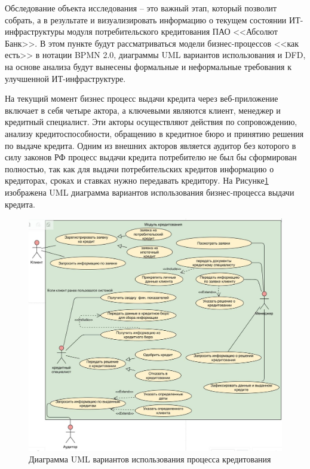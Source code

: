 \documentclass[14pt, a4paper]{extarticle}
\begin{document}
Обследование объекта исследования -- это важный этап, который позволит
собрать, а в результате и визуализировать информацию о текущем состоянии
ИТ-инфраструктуры модуля потребительского кредитования ПАО <<Абсолют Банк>>. В
этом пункте будут рассматриваться модели бизнес-процессов <<как есть>> в
нотации BPMN 2.0, диаграммы UML вариантов использования и DFD, на основе
анализа будут вынесены формальные и неформальные требования к улучшенной
ИТ-инфраструктуре.

На текущий момент бизнес процесс выдачи кредита через веб-приложение включает в
себя четыре актора, а ключевыми являются клиент, менеджер и кредитный
специалист. Эти акторы осуществляют действия по сопровождению, анализу
кредитоспособности, обращению в кредитное бюро и принятию решения по выдаче
кредита. Одним из внешних акторов является аудитор без которого в силу законов
РФ процесс выдачи кредита потребителю не был бы сформирован полностью, так как
для выдачи потребительских кредитов информацию о кредиторах, сроках и ставках
нужно передавать кредитору. На Рисунке\;\ref{fig:uml_use_case} изображена UML
диаграмма вариантов использования бизнес-процесса выдачи кредита.

\begin{figure}[H]
	\centering
	\includegraphics[scale=0.38]{uml_use_case_extended.png}
	\caption{Диаграмма UML вариантов использования процесса кредитования}
	\label{fig:uml_use_case}
\end{figure}
\end{document}
